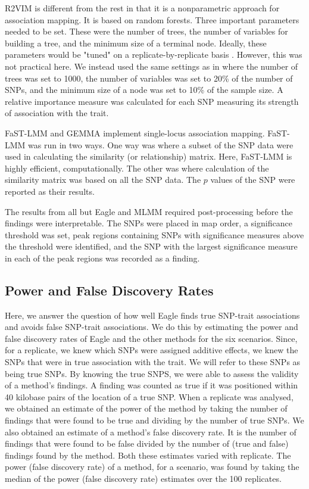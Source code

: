 \documentclass{article}
\begin{document}
R2VIM is different from the rest in that it is a nonparametric approach for association mapping. It is based on random forests. Three important parameters needed to be  set. 
These were the number of trees, the number of variables for building a tree, and the minimum size of a terminal node. Ideally, these parameters would be "tuned" on a replicate-by-replicate 
basis \citep{boulesteix2012overview}. However, this was not practical here. We instead used the same settings as in \citep{szymczak2016r2vim} where 
the number of trees was set to 1000, the number of variables was set to 20\% of the number of SNPs, and 
  the minimum size of a node was set to 10\% of the sample size.
A relative importance measure was calculated 
for each SNP measuring its strength of association with the trait.

FaST-LMM and GEMMA implement single-locus association mapping. FaST-LMM was run in two ways. One way was where a subset of the SNP data were used in calculating the similarity (or relationship) matrix. Here, FaST-LMM is highly efficient, computationally. The other was where calculation of the similarity matrix was based on all the SNP data. The $p$ values of the SNP were reported as their results. 


The results from all but Eagle and MLMM required post-processing before the findings were interpretable.  The SNPs were placed in map order, 
a significance threshold was set, peak regions containing SNPs with significance measures above the threshold were identified, and the SNP with the largest 
significance measure in each of the peak regions was recorded as a finding. 


 



\subsection{Power and False Discovery Rates}

Here, we answer the question of how well Eagle finds true SNP-trait associations and avoids false SNP-trait associations. We do this by estimating the power and false discovery rates of Eagle and the other methods for the six scenarios.  Since, for a replicate, we knew which SNPs were assigned additive effects, we knew the SNPs that were in true association with the trait. We will refer to these SNPs as being
true SNPs. By knowing the true SNPS, we were able to assess the validity of a method's findings. A  finding was counted as true if it was positioned within 40 kilobase pairs of the location of a true SNP. When a replicate was analysed, we obtained an estimate of the power of the method by taking  the number of findings that were found to be  true and dividing by the 
number of true SNPs. We also obtained an estimate of a method's false discovery rate. It is the number of findings that were found to be false divided by the number of (true and false) findings found by the method.  Both these estimates varied with replicate. 
The power (false discovery rate) of a method, for a scenario, was found by taking the median of the power (false discovery rate) estimates over the 100 replicates. 
\end{document}
